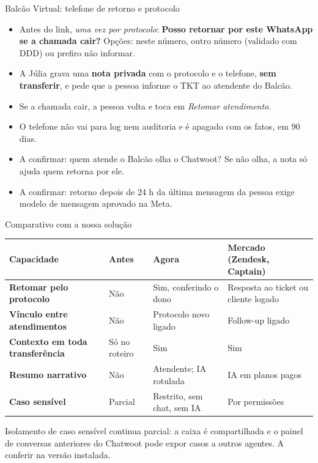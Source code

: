 \documentclass[aspectratio=169,10pt]{beamer}
\begin{document}
\begin{frame}{Balcão Virtual: telefone de retorno e protocolo}
\begin{itemize}\setlength\itemsep{5pt}\small
  \item Antes do link, \emph{uma vez por protocolo}: \textbf{Posso retornar por este WhatsApp se a chamada cair?} Opções: neste número, outro número (validado com DDD) ou prefiro não informar.
  \item A Júlia grava uma \textbf{nota privada} com o protocolo e o telefone, \textbf{sem transferir}, e pede que a pessoa informe o TKT ao atendente do Balcão.
  \item Se a chamada cair, a pessoa volta e toca em \emph{Retomar atendimento}.
  \item O telefone não vai para log nem auditoria e é apagado com os fatos, em 90 dias.
  \item \alert{A confirmar:} quem atende o Balcão olha o Chatwoot? Se não olha, a nota só ajuda quem retorna por ele.
  \item \alert{A confirmar:} retorno depois de 24 h da última mensagem da pessoa exige modelo de mensagem aprovado na Meta.
\end{itemize}
\end{frame}

\begin{frame}{Comparativo com a nossa solução}
\small
\begin{tabularx}{\linewidth}{@{}>{\bfseries}p{3.4cm}>{\raggedright\arraybackslash}X>{\raggedright\arraybackslash}X>{\raggedright\arraybackslash}X@{}}
\toprule
Capacidade & Antes & Agora & Mercado (Zendesk, Captain) \\
\midrule
Retomar pelo protocolo & Não & Sim, conferindo o dono & Resposta ao ticket ou cliente logado \\
Vínculo entre atendimentos & Não & Protocolo novo ligado & Follow-up ligado \\
Contexto em toda transferência & Só no roteiro & Sim & Sim \\
Resumo narrativo & Não & Atendente; IA rotulada & IA em planos pagos \\
Caso sensível & Parcial & Restrito, sem chat, sem IA & Por permissões \\
\bottomrule
\end{tabularx}
\vskip6pt
{\scriptsize\textcolor{cinza}{Isolamento de caso sensível continua parcial: a caixa é compartilhada e o painel de conversas anteriores do Chatwoot pode expor casos a outros agentes. A conferir na versão instalada.}}
\end{frame}
\end{document}
